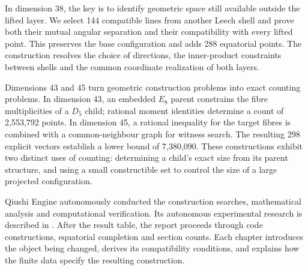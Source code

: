 In dimension 38, the key is to identify geometric space still available
outside the lifted layer. We select 144 compatible lines from another
Leech shell and prove both their mutual angular separation and their
compatibility with every lifted point. This preserves the base configuration
and adds 288 equatorial points. The construction resolves the choice of
directions, the inner-product constraints between shells and the common
coordinate realization of both layers.

Dimensions 43 and 45 turn geometric construction problems into exact
counting problems. In dimension 43, an embedded $E_8$ parent constrains
the fibre multiplicities of a $D_5$ child; rational moment identities
determine a count of 2,553,792 points. In dimension 45, a rational
inequality for the target fibres is combined with a common-neighbour
graph for witness search. The resulting 298 explicit vectors establish
a lower bound of 7,380,090. These constructions exhibit two distinct
uses of counting: determining a child's exact size from its parent
structure, and using a small constructible set to control the size
of a large projected configuration.

Qiushi Engine autonomously conducted the construction searches, mathematical
analysis and computational verification. Its autonomous experimental research
is described in \cite{qiushi-optics}. After the result
table, the report proceeds through code constructions, equatorial completion
and section counts. Each chapter introduces the object being changed,
derives its compatibility conditions, and explains how the finite data
specify the resulting construction.
